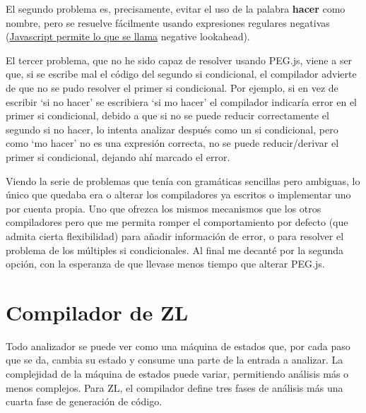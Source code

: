 \documentclass{report}
\begin{document}
			\vspace{10px}
			
			El segundo problema es, precisamente, evitar el uso de la palabra \textbf{hacer} como nombre, pero se resuelve fácilmente usando expresiones regulares negativas (\hyperref[app:c]{Javascript permite lo que se llama} negative lookahead\cite{lookahead}). 
			
			\vspace{10px}
			
			El tercer problema, que no he sido capaz de resolver usando PEG.js, viene a ser que, si se escribe mal el código del segundo si condicional, el compilador advierte de que no se pudo resolver el primer si condicional. Por ejemplo, si en vez de escribir `si no hacer' se escribiera `si mo hacer' el compilador indicaría error en el primer si condicional, debido a que si no se puede reducir correctamente el segundo si no hacer, lo intenta analizar después como un si condicional, pero como `mo hacer' no es una expresión correcta, no se puede reducir/derivar el primer si condicional, dejando ahí marcado el error.
			
			\vspace{10px}
			
			Viendo la serie de problemas que tenía con gramáticas sencillas pero ambiguas, lo único que quedaba era o alterar los compiladores ya escritos o implementar uno por cuenta propia. Uno que ofrezca los mismos mecanismos que los otros compiladores pero que me permita romper el comportamiento por defecto (que admita cierta flexibilidad) para añadir información de error, o para resolver el problema de los múltiples si condicionales. Al final me decanté por la segunda opción, con la esperanza de que llevase menos tiempo que alterar PEG.js.
	
	\section{Compilador de ZL}
	
	
	Todo analizador se puede ver como una máquina de estados que, por cada paso que se da, cambia su estado y consume una parte de la entrada a analizar. La complejidad de la máquina de estados puede variar, permitiendo análisis más o menos complejos. Para ZL, el compilador define tres fases de análisis más una cuarta fase de generación de código.
	
	
\end{document}
